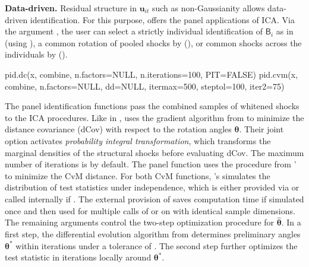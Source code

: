 \textbf{Data-driven.} Residual structure in $ \boldsymbol{u}_{it} $ such as non-Gaussianity allows data-driven identification. For this purpose,  offers the panel applications of ICA. Via the argument , the user can select a strictly individual identification of $ \textsf{B}_i $ as in  (using ), a common rotation of pooled shocks by \citet{Herwartz2017} (), or  common shocks across the individuals by \citet{CalhounEtAl2002} (). 
\begin{CodeChunk}
\begin{CodeInput}
pid.dc(x,  combine, n.factors=NULL, n.iterations=100, PIT=FALSE)
pid.cvm(x, combine, n.factors=NULL, dd=NULL, itermax=500, steptol=100, iter2=75)
\end{CodeInput}
\end{CodeChunk}
The panel identification functions pass the combined samples of whitened shocks to the ICA procedures. Like  in ,  uses the gradient algorithm from  to minimize the distance covariance (dCov) with respect to the rotation angles $ \boldsymbol{\theta} $. Their joint option  activates \textit{probability integral transformation}, which transforms the marginal densities of the structural shocks before evaluating dCov. The maximum number of iterations is  by default. The panel function  uses the procedure from '  to minimize the CvM distance. For both CvM functions, 's \citep{KojadinovicYan2010}  simulates the distribution of test statistics under independence, which is either provided via  or called internally if . The external provision of  saves computation time if simulated once and then used for multiple calls of  or  on  with identical sample dimensions. The remaining arguments control the two-step optimization procedure for $ \boldsymbol{\widehat{\theta}} $. In a first step, the differential evolution algorithm from  \citep{MullenEtAl2011} determines preliminary angles $ \boldsymbol{{\theta}^*} $ within  iterations under a tolerance of . The second step further optimizes the test statistic in  iterations locally around $ \boldsymbol{{\theta}^*} $.

